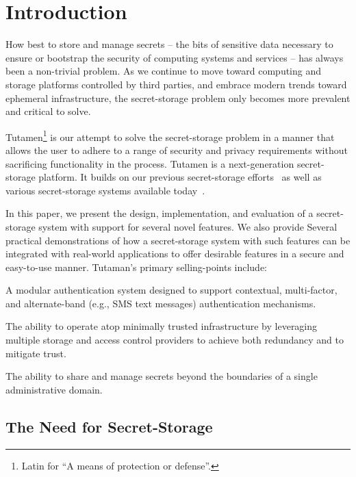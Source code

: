 \section{Introduction}
\label{sec:intro}

How best to store and manage secrets -- the bits of sensitive data
necessary to ensure or bootstrap the security of computing systems and
services -- has always been a non-trivial problem. As we continue to
move toward computing and storage platforms controlled by third
parties, and embrace modern trends toward ephemeral infrastructure,
the secret-storage problem only becomes more prevalent and critical to
solve.

Tutamen\footnote{Latin for ``A means of protection or defense''.} is
our attempt to solve the secret-storage problem in a manner that
allows the user to adhere to a range of security and privacy
requirements without sacrificing functionality in the process. Tutamen
is a next-generation secret-storage platform. It builds on our
previous secret-storage efforts~\cite{custos-trios} as well as various
secret-storage systems available today~\cite{vault, keywhiz,
  confidant}.

In this paper, we present the design, implementation, and evaluation
of a secret-storage system with support for several novel features. We
also provide Several practical demonstrations of how a secret-storage
system with such features can be integrated with real-world
applications to offer desirable features in a secure and easy-to-use
manner. Tutaman's primary selling-points include:
\begin{packed_item}
\item A modular authentication system designed to support contextual,
  multi-factor, and alternate-band (e.g., SMS text messages)
  authentication mechanisms.
\item The ability to operate atop minimally trusted infrastructure
  by leveraging multiple storage and access control providers to
  achieve both redundancy and to mitigate trust.
\item The ability to share and manage secrets beyond the boundaries
  of a single administrative domain.
\end{packed_item}

\subsection{The Need for Secret-Storage}

